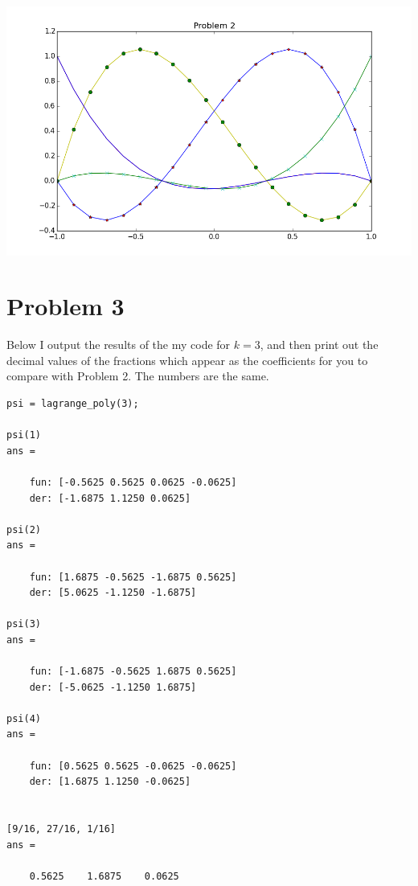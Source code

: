 \documentclass[10pt]{article}
\begin{document}
\begin{center}
\includegraphics[scale = 0.7]{prob2.png}
\end{center}
\newpage
\section*{Problem 3}
Below I output the results of the my code for $k=3$, and then print out the decimal values of the fractions which appear as the coefficients for you to compare with Problem 2. The numbers are the same.

\lstset{stepnumber=0, frame=single}
\begin{lstlisting}
psi = lagrange_poly(3);

psi(1) 
ans = 

    fun: [-0.5625 0.5625 0.0625 -0.0625]
    der: [-1.6875 1.1250 0.0625]

psi(2)
ans = 

    fun: [1.6875 -0.5625 -1.6875 0.5625]
    der: [5.0625 -1.1250 -1.6875]

psi(3)
ans = 

    fun: [-1.6875 -0.5625 1.6875 0.5625]
    der: [-5.0625 -1.1250 1.6875]

psi(4)
ans = 

    fun: [0.5625 0.5625 -0.0625 -0.0625]
    der: [1.6875 1.1250 -0.0625]


[9/16, 27/16, 1/16]
ans =

    0.5625    1.6875    0.0625

\end{lstlisting}
\end{document}
